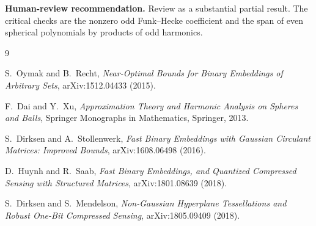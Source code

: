 \documentclass[11pt]{article}
\begin{document}
\textbf{Human-review recommendation.}  Review as a substantial partial result.
The critical checks are the nonzero odd Funk--Hecke coefficient and the span of
even spherical polynomials by products of odd harmonics.

\begin{thebibliography}{9}

S.~Oymak and B.~Recht,
\emph{Near-Optimal Bounds for Binary Embeddings of Arbitrary Sets},
arXiv:1512.04433 (2015).

F.~Dai and Y.~Xu,
\emph{Approximation Theory and Harmonic Analysis on Spheres and Balls},
Springer Monographs in Mathematics, Springer, 2013.

S.~Dirksen and A.~Stollenwerk,
\emph{Fast Binary Embeddings with Gaussian Circulant Matrices: Improved
Bounds}, arXiv:1608.06498 (2016).

D.~Huynh and R.~Saab,
\emph{Fast Binary Embeddings, and Quantized Compressed Sensing with Structured
Matrices}, arXiv:1801.08639 (2018).

S.~Dirksen and S.~Mendelson,
\emph{Non-Gaussian Hyperplane Tessellations and Robust One-Bit Compressed
Sensing}, arXiv:1805.09409 (2018).

\end{thebibliography}
\end{document}
